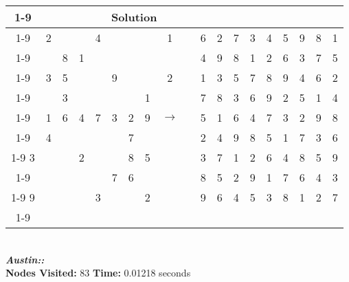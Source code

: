 \documentclass{article}
\begin{document}
\begin{tabular}{||c|c|c||c|c|c||c|c|c|| c ||c|c|c||c|c|c||c|c|c||}
  \cmidrule{1-9} \cmidrule{11-19}
  \multicolumn{9}{|c|}{Problem} &                   & \multicolumn{9}{|c|}{Solution}   \\\cmidrule{1-9} \cmidrule{11-19} \morecmidrules \cmidrule{1-9} \cmidrule{11-19}
  & 2 &   &   & 4 &   &   &   & 1 &  & 6 & 2 & 7 & 3 & 4 & 5 & 9 & 8 & 1\\\cmidrule{1-9} \cmidrule{11-19}
  &   & 8 & 1 &   &   &   &   &   &  & 4 & 9 & 8 & 1 & 2 & 6 & 3 & 7 & 5\\\cmidrule{1-9} \cmidrule{11-19}
  & 3 & 5 &   &   & 9 &   &   & 2 &  & 1 & 3 & 5 & 7 & 8 & 9 & 4 & 6 & 2\\\cmidrule{1-9} \cmidrule{11-19} \morecmidrules \cmidrule{1-9} \cmidrule{11-19}
  &   & 3 &   &   &   &   & 1 &   &  & 7 & 8 & 3 & 6 & 9 & 2 & 5 & 1 & 4\\\cmidrule{1-9} \cmidrule{11-19}
  & 1 & 6 & 4 & 7 & 3 & 2 & 9 & $\rightarrow$  &  & 5 & 1 & 6 & 4 & 7 & 3 & 2 & 9 & 8\\\cmidrule{1-9} \cmidrule{11-19}
  & 4 &   &   &   &   & 7 &   &   &  & 2 & 4 & 9 & 8 & 5 & 1 & 7 & 3 & 6\\\cmidrule{1-9} \cmidrule{11-19} \morecmidrules \cmidrule{1-9} \cmidrule{11-19}
3 &   &   & 2 &   &   & 8 & 5 &   &  & 3 & 7 & 1 & 2 & 6 & 4 & 8 & 5 & 9\\\cmidrule{1-9} \cmidrule{11-19}
  &   &   &   &   & 7 & 6 &   &   &  & 8 & 5 & 2 & 9 & 1 & 7 & 6 & 4 & 3\\\cmidrule{1-9} \cmidrule{11-19}
9 &   &   &   & 3 &   &   & 2 &   &  & 9 & 6 & 4 & 5 & 3 & 8 & 1 & 2 & 7\\\cmidrule{1-9} \cmidrule{11-19} \morecmidrules \cmidrule{1-9} \cmidrule{11-19}

\end{tabular}
\\
\small\emph{\textbf{Austin::}}\\ \textbf{Nodes Visited:} 83 \textbf{Time:} 0.01218 seconds\\
\end{document}
